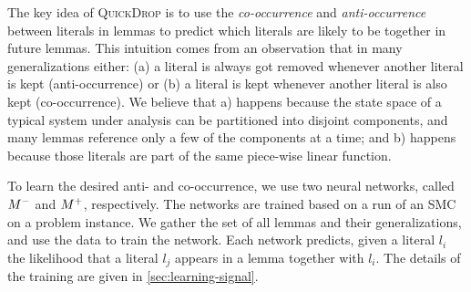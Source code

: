 



The key idea of \textsc{QuickDrop} is to use the \textit{co-occurrence} and
\textit{anti-occurrence} between literals in lemmas to predict which literals are
likely to be together in future lemmas. This intuition comes from an
observation that in many generalizations either: (a) a literal is
always got removed whenever another literal is kept (anti-occurrence) or (b) a
literal is kept whenever another literal is also kept (co-occurrence). We believe
that a) happens because the state space of a typical system under analysis can
be partitioned into disjoint components, and many lemmas reference only a few of
the components at a time; and b) happens because those literals are part of the same piece-wise linear function.

To learn the desired anti- and co-occurrence, we use two neural networks, called
$M^-$ and $M^+$, respectively. The networks are trained based on a run of an
SMC on a problem instance. We gather the set of all lemmas and their
generalizations, and use the data to train the network. Each network predicts,
given a literal $l_i$ the likelihood that a literal $l_j$ appears in a lemma
together with $l_i$. The details of the training are given in \cref{sec:learning-signal}.






